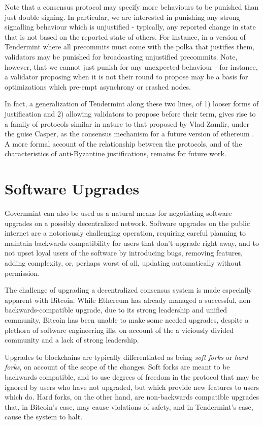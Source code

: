 Note that a consensus protocol may specify more behaviours to be punished than just double signing.
In particular, we are interested in punishing any strong signalling behaviour which is unjustified - typically, any reported change in state that is not based on the reported state of others.
For instance, in a version of Tendermint where all precommits 
must come with the polka that justifies them,
validators may be punished for broadcasting unjustified precommits.
Note, however, that we cannot just punish for any unexpected behaviour - 
for instance, a validator proposing when it is not their round to propose
may be a basis for optimizations which pre-empt asynchrony or crashed nodes.

In fact, a generalization of Tendermint along these two lines, 
of 1) looser forms of justification and 2) allowing validators to propose before their term,
gives rise to a family of protocols similar in nature to that proposed by Vlad Zamfir,
under the guise Casper, as the consensus mechanism for a future version of ethereum \cite{casper}.
A more formal account of the relationship between the protocols, 
and of the characteristics of anti-Byzantine justifications, remains for future work.

\section{Software Upgrades}

Governmint can also be used as a natural means for negotiating software upgrades on a possibly decentralized network.
Software upgrades on the public internet are a notoriously challenging operation,
requiring careful planning to maintain backwards compatibility for users that don't upgrade right away,
and to not upset loyal users of the software by introducing bugs, removing features, adding complexity, or,
perhaps worst of all, updating automatically without permission.

The challenge of upgrading a decentralized consensus system is made especially apparent with Bitcoin.
While Ethereum has already managed a successful, non-backwards-compatible upgrade, 
due to its strong leadership and unified community,
Bitcoin has been unable to make some needed upgrades,
despite a plethora of software engineering ills,
on account of the a viciously divided community and a lack of strong leadership.

Upgrades to blockchains are typically differentiated as being \emph{soft forks} or \emph{hard forks},
on account of the scope of the changes.
Soft forks are meant to be backwards compatible, and to use degrees of freedom in the protocol that may be ignored
by users who have not upgraded, but which provide new features to users which do.
Hard forks, on the other hand, are non-backwards compatible upgrades that,
in Bitcoin's case, may cause violations of safety, 
and in Tendermint's case, cause the system to halt.

